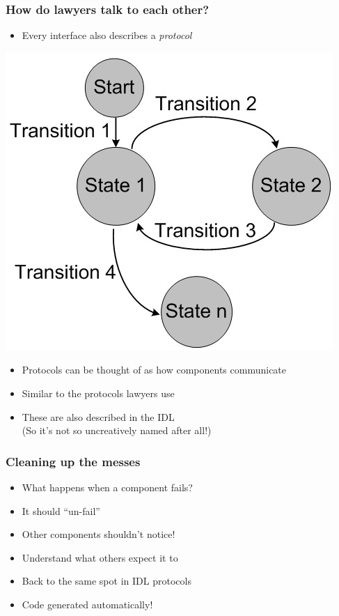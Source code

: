 \documentclass[bigger]{beamer}
\begin{document}
\begin{frame}
\frametitle{How do lawyers talk to each other?}
\label{sec-9}

\begin{itemize}
\item Every interface also describes a \emph{protocol}
\end{itemize}
\includegraphics[scale=0.25]{../pictures/fsm.jpg}
\begin{itemize}
\item Protocols can be thought of as how components communicate
\item Similar to the protocols lawyers use
\item These are also described in the IDL \\ (So it's not so uncreatively named after all!)
\end{itemize}
\end{frame}
\begin{frame}
\frametitle{Cleaning up the messes}
\label{sec-10}

\begin{itemize}
\item What happens when a component fails?
\item It should ``un-fail''
\item Other components shouldn't notice!
\item Understand what others expect it to
\item Back to the same spot in IDL protocols
\item Code generated automatically!
\end{itemize}
\end{frame}
\end{document}
